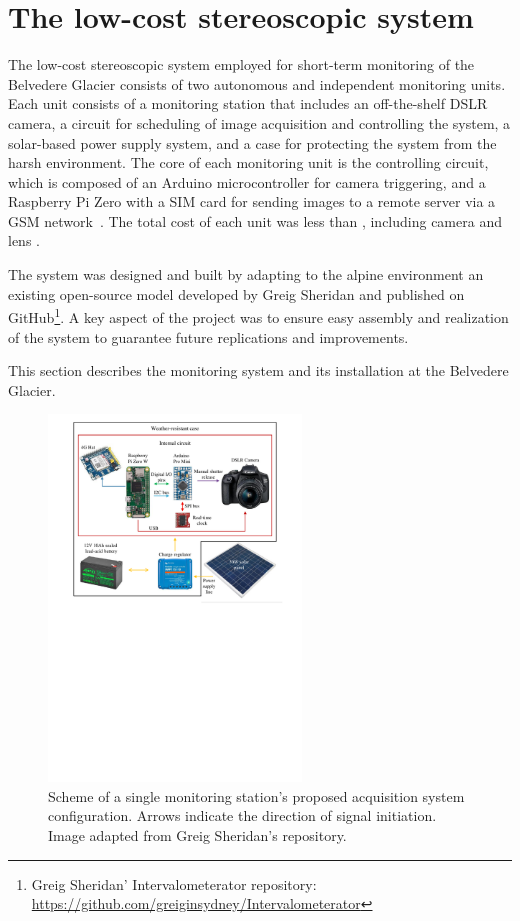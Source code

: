
\section{The low-cost stereoscopic system}\label{sec:4:system}

The low-cost stereoscopic system employed for short-term monitoring of the Belvedere Glacier consists of two autonomous and independent monitoring units. 
Each unit consists of a monitoring station that includes an off-the-shelf DSLR camera, a circuit for scheduling of image acquisition and controlling the system, a solar-based power supply system, and a case for protecting the system from the harsh environment. 
The core of each monitoring unit is the controlling circuit, which is composed of an Arduino microcontroller for camera triggering, and a Raspberry Pi Zero with a SIM card for sending images to a remote server via a GSM network~.
The total cost of each unit was less than , including camera and lens \citep{ioli2023_replicable}.

The system was designed and built by adapting to the alpine environment an existing open-source model developed by Greig Sheridan and published on
GitHub\footnote{\label{foot:greig}Greig Sheridan' Intervalometerator repository:
  \url{https://github.com/greiginsydney/Intervalometerator}}.
A key aspect of the project was to ensure easy assembly and realization of the system to guarantee future replications and improvements.

This section describes the monitoring system and its installation at the Belvedere Glacier.

\begin{figure}[ht!]
  \centering
  \includegraphics[width=0.6\textwidth]{schema.pdf}
  \caption{Scheme of a single monitoring station's proposed acquisition system configuration. Arrows indicate the direction of signal initiation. Image adapted
    from Greig Sheridan's repository.}
  \label{fig:4:scheme_foto}
\end{figure}


